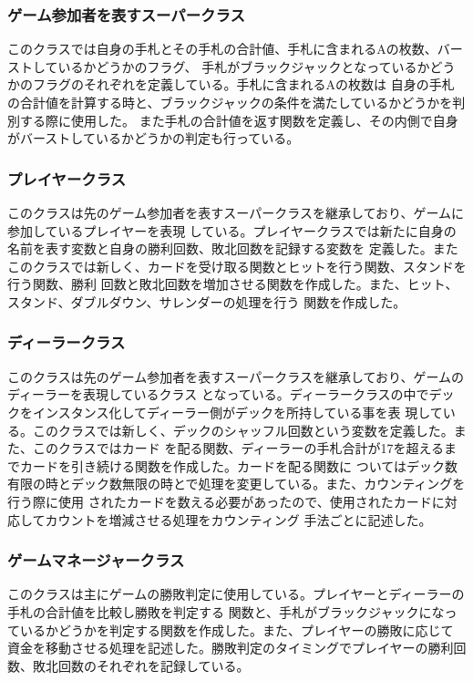 \subsubsection{ゲーム参加者を表すスーパークラス}
このクラスでは自身の手札とその手札の合計値、手札に含まれるAの枚数、バーストしているかどうかのフラグ、
手札がブラックジャックとなっているかどうかのフラグのそれぞれを定義している。手札に含まれるAの枚数は
自身の手札の合計値を計算する時と、ブラックジャックの条件を満たしているかどうかを判別する際に使用した。
また手札の合計値を返す関数を定義し、その内側で自身がバーストしているかどうかの判定も行っている。

\subsubsection{プレイヤークラス}
このクラスは先のゲーム参加者を表すスーパークラスを継承しており、ゲームに参加しているプレイヤーを表現
している。プレイヤークラスでは新たに自身の名前を表す変数と自身の勝利回数、敗北回数を記録する変数を
定義した。またこのクラスでは新しく、カードを受け取る関数とヒットを行う関数、スタンドを行う関数、勝利
回数と敗北回数を増加させる関数を作成した。また、ヒット、スタンド、ダブルダウン、サレンダーの処理を行う
関数を作成した。

\subsubsection{ディーラークラス}
このクラスは先のゲーム参加者を表すスーパークラスを継承しており、ゲームのディーラーを表現しているクラス
となっている。ディーラークラスの中でデックをインスタンス化してディーラー側がデックを所持している事を表
現している。このクラスでは新しく、デックのシャッフル回数という変数を定義した。また、このクラスではカード
を配る関数、ディーラーの手札合計が17を超えるまでカードを引き続ける関数を作成した。カードを配る関数に
ついてはデック数有限の時とデック数無限の時とで処理を変更している。また、カウンティングを行う際に使用
されたカードを数える必要があったので、使用されたカードに対応してカウントを増減させる処理をカウンティング
手法ごとに記述した。

\subsubsection{ゲームマネージャークラス}
このクラスは主にゲームの勝敗判定に使用している。プレイヤーとディーラーの手札の合計値を比較し勝敗を判定する
関数と、手札がブラックジャックになっているかどうかを判定する関数を作成した。また、プレイヤーの勝敗に応じて
資金を移動させる処理を記述した。勝敗判定のタイミングでプレイヤーの勝利回数、敗北回数のそれぞれを記録している。

